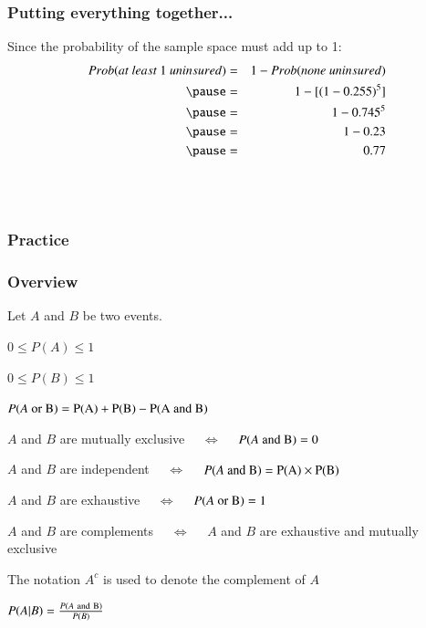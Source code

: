 \begin{frame}
\frametitle{Putting everything together...}

Since the probability of the sample space must add up to 1:
\begin{eqnarray*}
Prob(at~least~1~uninsured) &=& 1 - Prob(none~uninsured) \\
\pause
&=& 1 - [(1-0.255)^5] \\
\pause
&=& 1- 0.745^5 \\
\pause
&=& 1 - 0.23 \\
\pause
&=& 0.77
\end{eqnarray*}

$\:$ \\
$\:$ \\


\end{frame}


\begin{frame}
\frametitle{Practice}


{
}

\end{frame}



\begin{frame}
\frametitle{Overview}
\footnotesize
Let $A$ and $B$ be two events.

$0\le P(A) \le 1$

$0\le P(B) \le 1$

$P(A~\rm{or}~B) = P(A) + P(B) - P(A~\rm{and}~B)$

$A$ and $B$ are mutually exclusive ~~$\iff$~~ $P(A~\rm{and}~B)=0$

$A$ and $B$ are independent ~~$\iff$~~ $P(A~\rm{and}~B)=P(A)\times P(B)$

$A$ and $B$ are exhaustive ~~$\iff$~~ $P(A~\rm{or}~B)=1$

$A$ and $B$ are complements ~~$\iff$~~ $A$ and $B$ are exhaustive and mutually exclusive

The notation $A^c$ is used to denote the complement of $A$

$P(A|B) = \frac{P(A~\rm{and}~B)}{P(B)}$


\end{frame}
